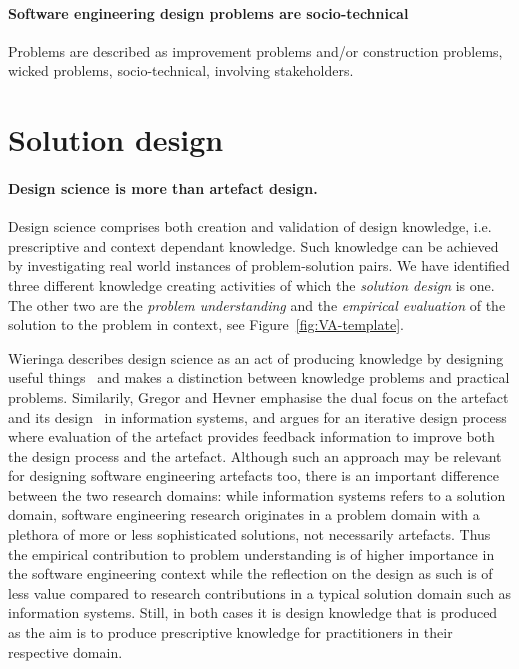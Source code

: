 \documentclass[graybox]{svmult}
\begin{document}
\paragraph{Software engineering design problems are socio-technical}
Problems are described as improvement problems and/or construction problems, wicked problems, socio-technical, involving stakeholders. 



\section{Solution design}
\paragraph{Design science is more than artefact design.}

Design science comprises both creation and validation of design knowledge, i.e. prescriptive and context dependant knowledge. Such knowledge can be achieved by investigating real world instances of problem-solution pairs. We have identified three different knowledge creating activities of which the \emph{solution design} is one. The other two are the \emph{problem understanding} and the \emph{empirical evaluation} of the solution to the problem in context, see Figure~\ref{fig:VA-template}.

Wieringa describes design science as an act of producing knowledge by designing useful things~\cite{wieringa_design_2009} and makes a distinction between knowledge problems and practical problems. Similarily, Gregor and Hevner emphasise the dual focus on the artefact and its design~\cite{gregor_positioning_2013} in information systems, and argues for an iterative design process where evaluation of the artefact provides feedback information to improve both the design process and the artefact. Although such an approach may be relevant for designing software engineering artefacts too, there is an important difference between the two research domains: while information systems refers to a solution domain, software engineering research originates in a problem domain with a plethora of more or less sophisticated solutions, not necessarily artefacts. Thus the empirical contribution to problem understanding is of higher importance in the software engineering context while the reflection on the design as such is of less value compared to research contributions in a typical solution domain such as information systems. Still, in both cases it is design knowledge that is produced as the aim is to produce prescriptive knowledge for practitioners in their respective domain. 
\end{document}
